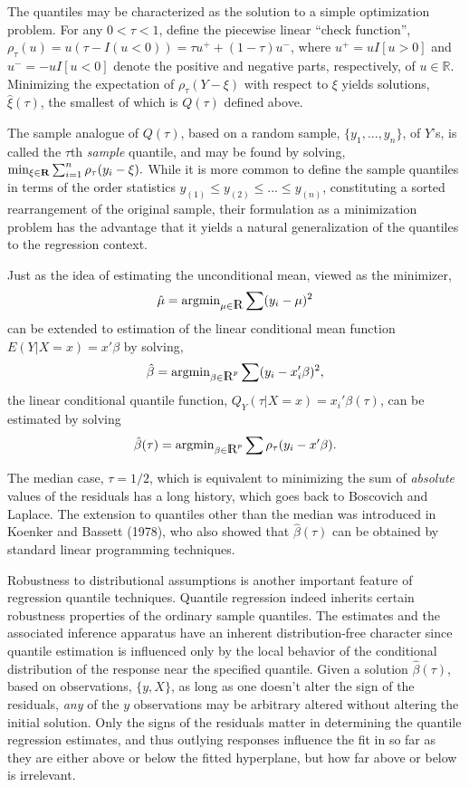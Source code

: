 \documentclass{amsart}
\def\RR{\hbox{\raise.4ex\hbox{$\scriptstyle{|}$}\hskip-1.85pt R}}
\newcommand{\R}{\mathbb R}
\begin{document}
The quantiles may be characterized as the solution to a  simple optimization 
problem.  For any $0 < \tau < 1$,  define the piecewise linear
``check function'', $\rho_\tau (u) = u ( \tau - I(u < 0 )) = \tau u^+ + (1-\tau )u^-$, where $u^+=u I[u>0]$ and  $u^-= -uI[u<0]$ denote the positive and negative parts, respectively,  of  $u\in\R$.  Minimizing the expectation of $\rho_\tau(Y-\xi)$ with respect to $\xi$
yields solutions, $\hat \xi (\tau)$, the smallest of which is $Q(\tau)$ defined
above.  

The sample analogue of $Q(\tau)$,
based on a random sample, $\{ y_1 , ... , y_n \}$, of $Y$'s, 
is called the $\tau$th {\it sample} quantile, and may be found by solving,
 $
\min_{\xi \in {\bf R}}  \sum_{i=1}^n \rho_{\tau} ( y_i - \xi ). 
$ 
While it is more common to define the sample quantiles in terms of 
the order statistics  $ y_{(1)} \leq y_{(2)} \leq ... \leq y_{(n)}$,
constituting a sorted rearrangement of the original sample, their
formulation as a minimization problem has the advantage that it
yields a natural generalization of the quantiles to the regression context.  

Just as the idea of estimating the unconditional mean, 
viewed as the minimizer,
\[
\hat \mu = \mathrm{argmin}_{\mu \in \RR} \sum (y_i - \mu)^2
\]
can be extended
to estimation of the linear conditional mean function $E(Y|X=x)=x' \beta$
by solving,
\[
\hat \beta = \mathrm{argmin}_{\beta \in \RR^p} \sum (y_i - x_i' \beta)^2 ,
\]
the linear conditional quantile function, $Q_Y(\tau | X=x) = x_i' \beta (\tau)$,
can be estimated by solving
\[
\hat \beta (\tau) = 
\mathrm{argmin}_{\beta \in \RR^p} \sum \rho_\tau (y_i - x' \beta).
\]
 
 The median case, $\tau = 1/2$, which is equivalent to minimizing the
sum of {\it absolute} values of the residuals 
has a long history, which goes back to  Boscovich  and  Laplace.  
The extension to quantiles other than the median was introduced in
Koenker and Bassett (1978), who also showed that $\hat \beta (\tau)$ can be obtained by  standard linear programming techniques. 


Robustness to distributional assumptions is another  important feature of regression quantile techniques. Quantile regression indeed  inherits certain robustness properties  of the ordinary 
sample quantiles.  The estimates and the associated inference apparatus have
an inherent distribution-free character since quantile estimation is
influenced only by the local behavior of the conditional distribution
of the response near the specified quantile.  
Given a solution $\hat \beta (\tau)$, based on observations, $\{y,X\}$,
as long as one doesn't alter the sign of the residuals, {\em any} of the $y$
observations may be arbitrary altered without altering the initial solution.  
Only the signs of the residuals matter in determining the quantile regression
estimates, and thus outlying responses influence the fit in so far as
they are either above or below the fitted hyperplane, but how far above or
below is irrelevant.
 
\end{document}
